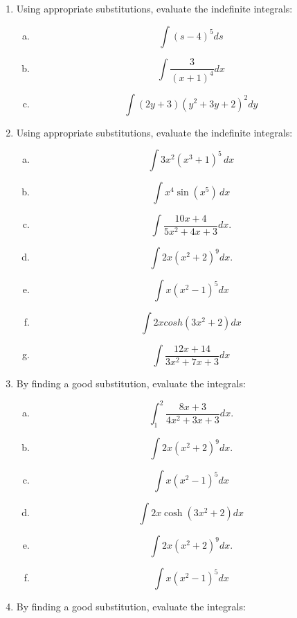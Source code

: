 \documentclass[a4paper,12pt]{article}
\begin{document}
\begin{enumerate}
    \item Using appropriate substitutions, evaluate the indefinite integrals:

\begin{multicols}{2}
	\begin{enumerate}[(a)]
		
		\item 
		\[ \int (s - 4)^5 ds \]
		\item 
		\[ \int 
		\frac{3}{(x + 1)^4 }dx\]
		\item 
		\[\int 
		(2y + 3)(y^2 + 3y + 2)^2 dy\]
		
	\end{enumerate}
\end{multicols}

\item Using appropriate substitutions, evaluate the indefinite integrals:
\begin{multicols}{2}
	\begin{enumerate}[(a)]
				\item	
		\[\int 3x^2 (x^3+1)^5 \, dx\]
		
		\item
		\[\int x^4 \sin(x^5) \, dx\]
		
			\item 
 \[ \int \frac{10x + 4}{5x^2 + 4x + 3} dx.\]
	\item 
	
\[ \int 2x(x^2 + 2)^9 dx.\]
	\item 
\[ \int x(x^2 − 1)^5 dx\]
	\item 
\[ \int 2x cosh(3x^2+2) dx \]
	\item 
\[ \int \frac{12x + 14}{3x^2 + 7x + 3} dx\]


	\end{enumerate}
\end{multicols}
	

\item   By finding a good substitution, evaluate the integrals:

\begin{multicols}{2}
\begin{enumerate}[(a)]
\item \[ \int^2_1 \frac{8x + 3}{4x^2 + 3x + 3} dx.\]
\item \[ \int 2x(x^2 + 2)^9 dx.\]
\item \[ \int x(x^2 - 1)^5 dx\]
\item \[ \int 2x \cosh(3x^2+2) dx \]
\item \[ \int 2x(x^2 + 2)^9 dx.\]
\item \[ \int x(x^2 − 1)^5 dx\]
\end{enumerate}
\end{multicols}
\item   By finding a good substitution, evaluate the integrals:


\end{enumerate}
\end{document}
